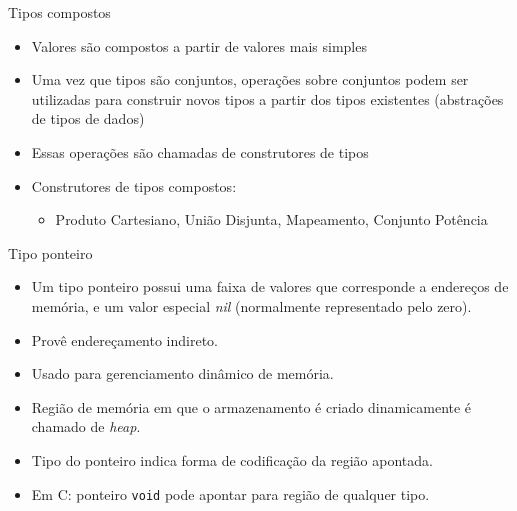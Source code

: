 \documentclass[handout]{beamer}
\begin{document}
\begin{frame}{Tipos compostos}

   \begin{itemize}
		\item Valores são compostos a partir de valores mais simples
		\item Uma vez que tipos são conjuntos, operações sobre conjuntos podem ser utilizadas para construir novos tipos a partir dos tipos existentes (abstrações de tipos de dados)
		\item Essas operações são chamadas de construtores de tipos

   \item Construtores de tipos compostos:
      \begin{itemize}
      \item Produto Cartesiano, União Disjunta, Mapeamento, Conjunto Potência
      \end{itemize}
	\end{itemize}
\end{frame}

\begin{frame}[fragile]{Tipo ponteiro}
\begin{itemize}
    \item Um tipo ponteiro possui uma faixa de valores que corresponde a endereços de memória, e um valor especial \textit{nil} (normalmente representado pelo zero).
    \item Provê endereçamento indireto.
    \item Usado para gerenciamento dinâmico de memória.
    \item Região de memória em que o armazenamento é criado dinamicamente é chamado de \textit{heap}.
    \item Tipo do ponteiro indica forma de codificação da região apontada.
    \item Em C: ponteiro \lstinline|void| pode apontar para região de qualquer tipo.
\end{itemize}
\end{frame}
\end{document}
